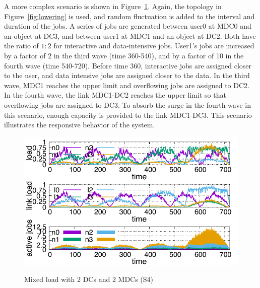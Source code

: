 A more complex scenario is shown in Figure~\ref{fig:mixed}.
Again, the topology in Figure~\ref{fig:lowering} is used, and
random fluctuation is added to the interval and duration of the jobs.
A series of jobs are generated
between user0 at MDC0 and an object at DC3, and
between user1 at MDC1 and an object at DC2.
Both have the ratio of $1:2$ for interactive and data-intensive jobs.
User1's jobs are increased by a factor of 2 in the third wave (time
360-540), and by a factor of 10 in the fourth wave (time 540-720). 
Before time 360, interactive jobs are assigned closer to the user,
and data intensive jobs are assigned closer to the data.
In the third wave, MDC1 reaches the upper limit and overflowing jobs are
assigned to DC2.
In the fourth wave, the link MDC1-DC2 reaches the upper limit so that
overflowing jobs are assigned to DC3.
To absorb the surge in the fourth wave in this scenario, enough
capacity is provided to the link MDC1-DC3.
This scenario illustrates the responsive behavior of the system.

\begin{figure}[tb]
  \begin{center}
    \includegraphics[width=1.0\columnwidth]{simu2.pdf}
    \vspace{-2.0ex}
    \caption{Mixed load with 2 DCs and 2 MDCs (S4)}
    \label{fig:mixed}
  \end{center}
\end{figure}


